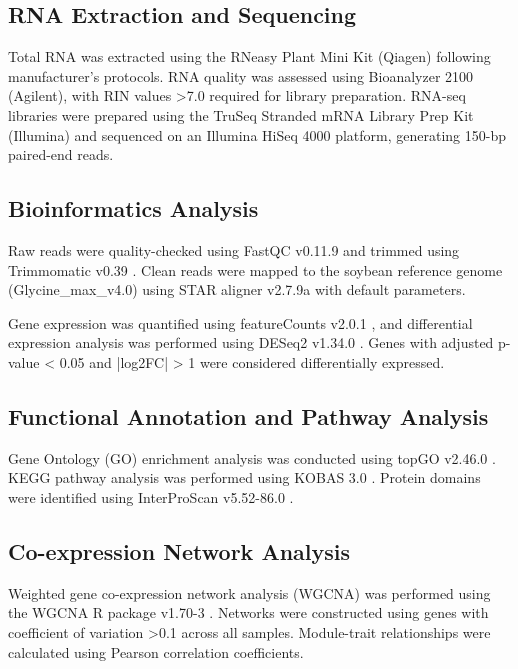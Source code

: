 \documentclass[11pt,a4paper]{article}
\begin{document}
\subsection{RNA Extraction and Sequencing}

Total RNA was extracted using the RNeasy Plant Mini Kit (Qiagen) following manufacturer's protocols. RNA quality was assessed using Bioanalyzer 2100 (Agilent), with RIN values >7.0 required for library preparation. RNA-seq libraries were prepared using the TruSeq Stranded mRNA Library Prep Kit (Illumina) and sequenced on an Illumina HiSeq 4000 platform, generating 150-bp paired-end reads.

\subsection{Bioinformatics Analysis}

Raw reads were quality-checked using FastQC v0.11.9 and trimmed using Trimmomatic v0.39 \citep{Bolger2014}. Clean reads were mapped to the soybean reference genome (Glycine\_max\_v4.0) using STAR aligner v2.7.9a \citep{Dobin2013} with default parameters.

Gene expression was quantified using featureCounts v2.0.1 \citep{Liao2014}, and differential expression analysis was performed using DESeq2 v1.34.0 \citep{Love2014}. Genes with adjusted p-value < 0.05 and |log2FC| > 1 were considered differentially expressed.

\subsection{Functional Annotation and Pathway Analysis}

Gene Ontology (GO) enrichment analysis was conducted using topGO v2.46.0 \citep{Alexa2006}. KEGG pathway analysis was performed using KOBAS 3.0 \citep{Bu2021}. Protein domains were identified using InterProScan v5.52-86.0 \citep{Jones2014}.

\subsection{Co-expression Network Analysis}

Weighted gene co-expression network analysis (WGCNA) was performed using the WGCNA R package v1.70-3 \citep{Langfelder2008}. Networks were constructed using genes with coefficient of variation >0.1 across all samples. Module-trait relationships were calculated using Pearson correlation coefficients.
\end{document}
